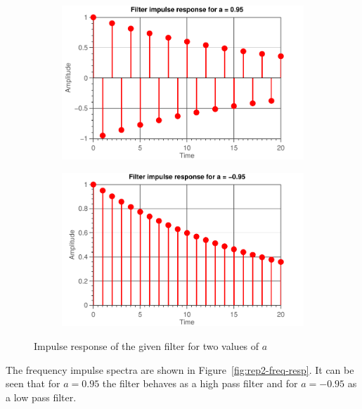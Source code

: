 \documentclass[11pt,titlepage]{report}
\begin{document}
\begin{figure}[H]
	\centering
	\begin{subfigure}{0.49\textwidth}
		\includegraphics[width=\textwidth]{../../deliverable-7-resources/figures/ass-1/report-2/ass-1-report-2-a-positive.pdf}
	\end{subfigure}
	\begin{subfigure}{0.49\textwidth}
		\includegraphics[width=\textwidth]{../../deliverable-7-resources/figures/ass-1/report-2/ass-1-report-2-a-negative.pdf}
	\end{subfigure}
	\caption{Impulse response of the given filter for two values of $a$}
	\label{fig:rep2-time-resp}
\end{figure}

The frequency impulse spectra are shown in Figure~\ref{fig:rep2-freq-resp}. It can be seen that for $a=0.95$ the filter behaves as a high pass filter and for $a=-0.95$ as a low pass filter.
\end{document}
